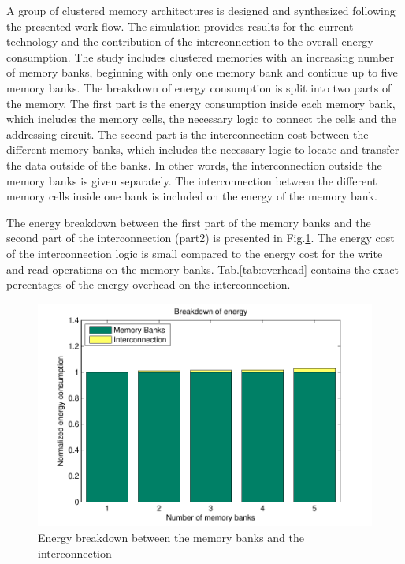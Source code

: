 \documentclass[12pt,a4paper]{article}
\begin{document}
A group of clustered memory architectures is designed and synthesized following the presented work-flow.
The simulation provides results for the current technology and the contribution of the interconnection to the overall energy consumption.
The study includes clustered memories with an increasing number of memory banks, beginning with only one memory bank and continue up to five memory banks.
The breakdown of energy consumption is split into two parts of the memory.
The first part is the energy consumption inside each memory bank, which includes the memory cells, the necessary logic to connect the cells and the addressing circuit.
The second part is the interconnection cost between the different memory banks, which includes the necessary logic to locate and transfer the data outside of the banks. 
In other words, the interconnection outside the memory banks is given separately. 
The interconnection between the different memory cells inside one bank is included on the energy of the memory bank.

The energy breakdown between the first part of the memory banks and the second part of the interconnection (part2) is presented in Fig.\ref{fig:energyE}.
The energy cost of the interconnection logic is small compared to the energy cost for the write and read operations on the memory banks.
Tab.\ref{tab:overhead} contains the exact percentages of the energy overhead on the interconnection. 

\begin{figure}
 \centering
 \includegraphics[width = \textwidth]{energy.pdf}
  \caption{Energy breakdown between the memory banks and the interconnection}
 \label{fig:energyE}
 \end{figure}
\end{document}
